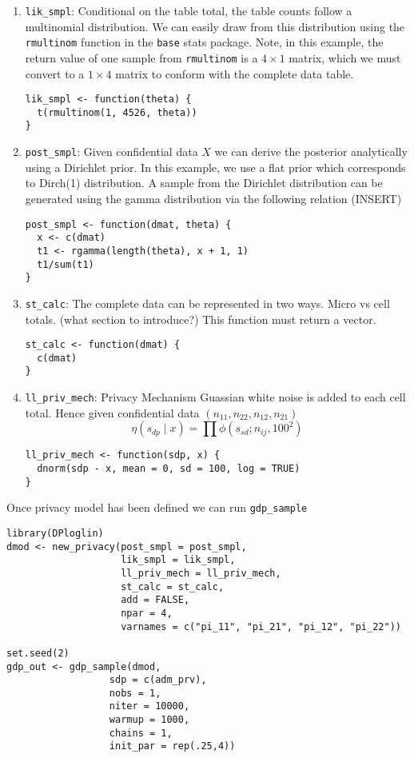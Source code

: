 \begin{enumerate}
\def\labelenumi{\arabic{enumi}.}
\item
  \texttt{lik\_smpl}: Conditional on the table total, the table counts follow a multinomial
  distribution. We can easily draw from this distribution using the
  \texttt{rmultinom} function in the \texttt{base} stats package. Note, in this example,
  the return value of one sample from \texttt{rmultinom} is a \(4 \times 1\) matrix, which
  we must convert to a \(1 \times 4\) matrix to conform with the complete data table.

\begin{verbatim}
lik_smpl <- function(theta) {
  t(rmultinom(1, 4526, theta))
}
\end{verbatim}
\item
  \texttt{post\_smpl}: Given confidential data \(X\) we can derive the posterior analytically
  using a Dirichlet prior. In this example, we use a flat prior which
  corresponds to Dirch(1) distribution. A sample from the Dirichlet distribution
  can be generated using the gamma distribution via the following relation (INSERT)

\begin{verbatim}
post_smpl <- function(dmat, theta) {
  x <- c(dmat)
  t1 <- rgamma(length(theta), x + 1, 1)
  t1/sum(t1)
}
\end{verbatim}
\item
  \texttt{st\_calc}: The complete data can be represented in two ways. Micro vs cell totals.
  (what section to introduce?) This function must return a vector.

\begin{verbatim}
st_calc <- function(dmat) {
  c(dmat)
}
\end{verbatim}
\item
  \texttt{ll\_priv\_mech}: Privacy Mechanism
  Guassian white noise is added to each cell total. Hence given
  confidential data \((n_{11}, n_{22}, n_{12}, n_{21})\)
  \[
  \eta(s_{dp} \mid x) = \prod \phi(s_{sd}; n_{ij}, 100^2)
  \]

\begin{verbatim}
ll_priv_mech <- function(sdp, x) {
  dnorm(sdp - x, mean = 0, sd = 100, log = TRUE)
}
\end{verbatim}
\end{enumerate}

Once privacy model has been defined we can run \texttt{gdp\_sample}

\begin{verbatim}
library(DPloglin)
dmod <- new_privacy(post_smpl = post_smpl,
                    lik_smpl = lik_smpl,
                    ll_priv_mech = ll_priv_mech,
                    st_calc = st_calc,
                    add = FALSE,
                    npar = 4,
                    varnames = c("pi_11", "pi_21", "pi_12", "pi_22"))

set.seed(2)
gdp_out <- gdp_sample(dmod,
                  sdp = c(adm_prv),
                  nobs = 1,
                  niter = 10000,
                  warmup = 1000,
                  chains = 1,
                  init_par = rep(.25,4))
\end{verbatim}

